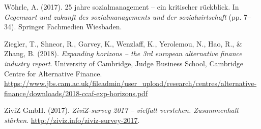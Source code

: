 \documentclass[
  letterpaper,
]{book}
\newlength{\cslhangindent}
\newenvironment{CSLReferences}[2] %
 {\begin{list}{}{%
  \setlength{\itemindent}{0pt}
  \setlength{\leftmargin}{0pt}
  \setlength{\parsep}{0pt}
  \ifodd #1
   \setlength{\leftmargin}{\cslhangindent}
   \setlength{\itemindent}{-1\cslhangindent}
  \fi
  \setlength{\itemsep}{#2\baselineskip}}}
 {\end{list}}
\begin{document}
\begin{CSLReferences}{1}{0}
Wöhrle, A. (2017). 25 jahre sozialmanagement -- ein kritischer
r{ü}ckblick. In \emph{Gegenwart und zukunft des sozialmanagements und
der sozialwirtschaft} (pp. 7--34). Springer Fachmedien Wiesbaden.

Ziegler, T., Shneor, R., Garvey, K., Wenzlaff, K., Yerolemou, N., Hao,
R., \& Zhang, B. (2018). \emph{Expanding horizons -- the 3rd european
alternative finance industry report}. University of Cambridge, Judge
Business School, Cambridge Centre for Alternative Finance.
\url{https://www.jbs.cam.ac.uk/fileadmin/user_upload/research/centres/alternative-finance/downloads/2018-ccaf-exp-horizons.pdf}

ZiviZ GmbH. (2017). \emph{ZiviZ-survey 2017 -- vielfalt verstehen.
Zusammenhalt stärken}. \url{http://ziviz.info/ziviz-survey-2017}.

\end{CSLReferences}


\backmatter

\printindex

\end{document}
